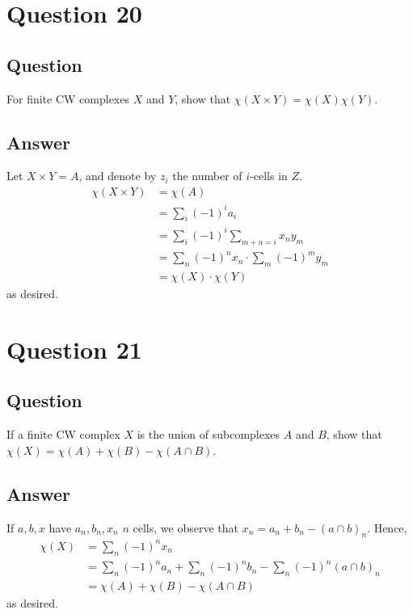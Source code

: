 \documentclass[11pt]{article}
\begin{document}
\section{Question 20}
\subsection{Question} For finite CW complexes $X$ and $Y$, show that $\chi(X \times Y) = \chi(X) \chi (Y)$.
\subsection{Answer}
Let $X \times Y =A$, and denote by $z_i$ the number of $i$-cells in $Z$.
\begin{align*}
\chi(X \times Y) &= \chi (A)\\
&= \sum_i (-1)^i a_i \\
&= \sum_i (-1)^i \sum_{m+n = i} x_n y_m \\
&= \sum_n (-1)^n x_n \cdot \sum_m (-1)^m y_m\\
&= \chi(X) \cdot \chi(Y)
\end{align*}
as desired.

\section{Question 21}
\subsection{Question}
If a finite CW complex $X$ is the union of subcomplexes $A$ and $B$, show that $\chi(X)= \chi(A) + \chi(B) - \chi(A \cap B)$.
\subsection{Answer}
If $a,b,x$ have $a_n,b_n,x_n$ $n$ cells, we observe that $x_n = a_n + b_n - (a \cap b)_n$. Hence, 
\begin{align*} \chi(X) &= \sum_n(-1)^n x_n\\& = \sum_n(-1)^n a_n +\sum_n(-1)^n b_n - \sum_n(-1)^n (a \cap b)_n \\&= \chi(A) + \chi(B) - \chi(A \cap B)\end{align*}
as desired. 
\end{document}
